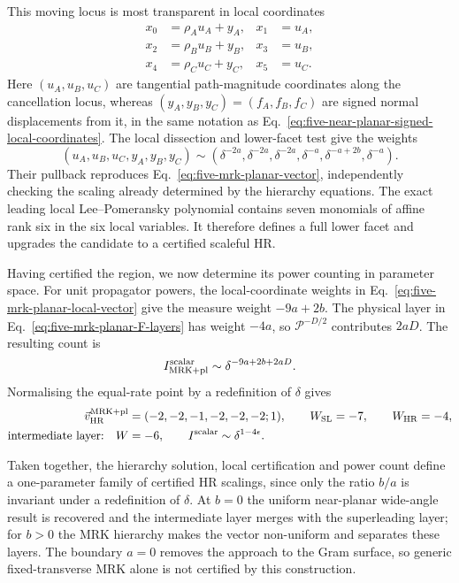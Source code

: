 \documentclass[a4paper,11pt]{article}
\newcommand{\vHR}{\vec v_{\rm HR}}
\begin{document}
This moving locus is most transparent in local coordinates
\begin{align}
 x_0&=\rho_Au_A+y_A,& x_1&=u_A,\nonumber\\
 x_2&=\rho_Bu_B+y_B,& x_3&=u_B,\nonumber\\
 x_4&=\rho_Cu_C+y_C,& x_5&=u_C.
 \label{eq:five-mrk-planar-local-coordinates}
\end{align}
Here \((u_A,u_B,u_C)\) are tangential path-magnitude coordinates along the
cancellation locus, whereas \((y_A,y_B,y_C)=(f_A,f_B,f_C)\) are signed
normal displacements from it, in the same notation as
Eq.~\eqref{eq:five-near-planar-signed-local-coordinates}.
The local dissection and lower-facet test give the weights
\begin{equation}
 (u_A,u_B,u_C,y_A,y_B,y_C)\sim
 \left(\delta^{-2a},\delta^{-2a},\delta^{-2a},
       \delta^{-a},\delta^{-a+2b},\delta^{-a}\right).
 \label{eq:five-mrk-planar-local-vector}
\end{equation}
Their pullback reproduces Eq.~\eqref{eq:five-mrk-planar-vector}, independently
checking the scaling already determined by the hierarchy equations.  The
exact leading local Lee--Pomeransky polynomial contains seven monomials of
affine rank six in the six local variables.  It therefore defines a full
lower facet and upgrades the candidate to a certified scaleful HR.

Having certified the region, we now determine its power counting in parameter
space.  For unit propagator powers, the local-coordinate weights in
Eq.~\eqref{eq:five-mrk-planar-local-vector} give the measure weight
\(-9a+2b\).  The physical layer in
Eq.~\eqref{eq:five-mrk-planar-F-layers} has weight \(-4a\), so
\(\mathcal P^{-D/2}\) contributes \(2aD\).  The resulting count is
\begin{equation}
 I_{\rm MRK+pl}^{\rm scalar}
 \sim\delta^{-9a+2b+2aD}.
 \label{eq:five-mrk-planar-parameter-power}
\end{equation}
Normalising the equal-rate point by a redefinition of \(\delta\) gives
\begin{equation}
 \begin{aligned}
 \vHR^{\rm MRK+pl}&=(-2,-2,-1,-2,-2,-2;1),\qquad
 W_{\rm SL}=-7,\qquad W_{\rm HR}=-4,\\
 \text{intermediate layer:}\quad W&=-6,\qquad
 I^{\rm scalar}\sim\delta^{1-4\epsilon}.
 \end{aligned}
 \label{eq:five-mrk-planar-equal-rate}
\end{equation}

Taken together, the hierarchy solution, local certification and power count
define a one-parameter family of certified HR scalings, since only the ratio
\(b/a\) is invariant under a redefinition of \(\delta\).  At \(b=0\) the
uniform near-planar wide-angle result is recovered and the intermediate layer
merges with the superleading layer; for \(b>0\) the MRK hierarchy makes the
vector non-uniform and separates these layers.  The boundary \(a=0\) removes
the approach to the Gram surface, so generic fixed-transverse MRK alone is not
certified by this construction.
\end{document}
